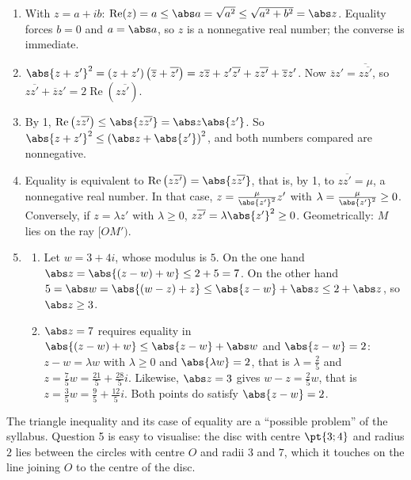 \begin{solution}[Problem]
\begin{enumerate}
\item With $z=a+ib$: $\operatorname{Re}(z)=a\le\abs a=\sqrt{a^2}\le\sqrt{a^2+b^2}=\abs z$. Equality forces $b=0$ and $a=\abs a$, so $z$ is a nonnegative real number; the converse is immediate.
\item $\abs{z+z'}^2=(z+z')\left(\overline z+\overline{z'}\right)=z\overline z+z'\overline{z'}+z\overline{z'}+\overline z z'$. Now $\overline z z'=\overline{z\overline{z'}}$, so $z\overline{z'}+\overline z z'=2\operatorname{Re}\left(z\overline{z'}\right)$.
\item By 1, $\operatorname{Re}\left(z\overline{z'}\right)\le\abs{z\overline{z'}}=\abs z\abs{z'}$. So $\abs{z+z'}^2\le\left(\abs z+\abs{z'}\right)^2$, and both numbers compared are nonnegative.
\item Equality is equivalent to $\operatorname{Re}\left(z\overline{z'}\right)=\abs{z\overline{z'}}$, that is, by 1, to $z\overline{z'}=\mu$, a nonnegative real number. In that case, $z=\frac{\mu}{\abs{z'}^2}z'$ with $\lambda=\frac{\mu}{\abs{z'}^2}\ge0$. Conversely, if $z=\lambda z'$ with $\lambda\ge0$, $z\overline{z'}=\lambda\abs{z'}^2\ge0$. Geometrically: $M$ lies on the ray $[OM')$.
\item
\begin{enumerate}
\item Let $w=3+4i$, whose modulus is $5$. On the one hand $\abs z=\abs{(z-w)+w}\le2+5=7$. On the other hand $5=\abs w=\abs{(w-z)+z}\le\abs{z-w}+\abs z\le2+\abs z$, so $\abs z\ge3$.
\item $\abs z=7$ requires equality in $\abs{(z-w)+w}\le\abs{z-w}+\abs w$ and $\abs{z-w}=2$: $z-w=\lambda w$ with $\lambda\ge0$ and $\abs{\lambda w}=2$, that is $\lambda=\frac25$ and $z=\frac75w=\frac{21}5+\frac{28}5i$. Likewise, $\abs z=3$ gives $w-z=\frac25w$, that is $z=\frac35w=\frac95+\frac{12}5i$. Both points do satisfy $\abs{z-w}=2$.
\end{enumerate}
\end{enumerate}
\end{solution}
\begin{teachernote}
The triangle inequality and its case of equality are a ``possible problem'' of the syllabus. Question 5 is easy to visualise: the disc with centre $\pt{3;4}$ and radius $2$ lies between the circles with centre $O$ and radii $3$ and $7$, which it touches on the line joining $O$ to the centre of the disc.
\end{teachernote}
